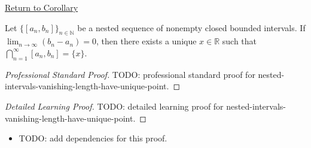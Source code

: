 \newpage
{}
\label{prf:nested-intervals-vanishing-length-have-unique-point}

\begin{remark*}[Return]
\hyperref[cor:nested-intervals-vanishing-length-have-unique-point]{Return to Corollary}
\end{remark*}

\begin{corollary*}
Let $\{[a_n,b_n]\}_{n\in\mathbb N}$ be a nested sequence of nonempty closed
bounded intervals. If $\lim_{n\to\infty}(b_n-a_n)=0$, then there exists a
unique $x\in\mathbb R$ such that
$\bigcap_{n=1}^{\infty}[a_n,b_n]=\{x\}$.
\end{corollary*}

\begin{proof}[Professional Standard Proof]
\LRAProofBodyStart
TODO: professional standard proof for nested-intervals-vanishing-length-have-unique-point.
\end{proof}

\begin{proof}[Detailed Learning Proof]
\LRAProofBodyStart
TODO: detailed learning proof for nested-intervals-vanishing-length-have-unique-point.
\end{proof}

\begin{remark*}
\end{remark*}

\begin{dependencies}
\begin{itemize}
  \item TODO: add dependencies for this proof.
\end{itemize}
\end{dependencies}

\clearpage

